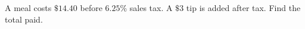 A meal costs $\$14.40$ before $6.25\%$ sales tax. A $\$3$ tip is added after tax. Find the total paid.

